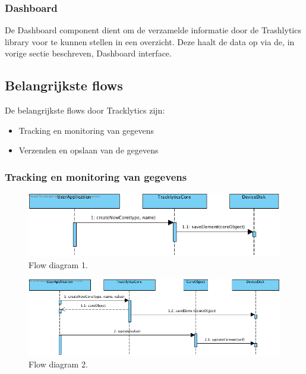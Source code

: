 \subsubsection{Dashboard}
De Dashboard component dient om de verzamelde informatie door de Trashlytics library voor te kunnen stellen in een overzicht. Deze haalt de data op via de, in vorige sectie beschreven, Dashboard interface. \\


\subsection{Belangrijkste flows}
De belangrijkste flows door Tracklytics zijn:
\begin{itemize}
\item Tracking en monitoring van gegevens
\item Verzenden en opslaan van de gegevens
\end{itemize} 


\subsubsection{Tracking en monitoring van gegevens}\label{sec:TrackingEnMonitoringVanGegevens}
\begin{figure}[!h]
  \centering
  \includegraphics[scale=0.4]{Afbeeldingen/Architectuur/FlowDiagram1}
  \caption{Flow diagram 1.}
  \label{fig:flow1}
\end{figure}
\begin{figure}[!h]
  \centering
  \includegraphics[scale=0.4]{Afbeeldingen/Architectuur/FlowDiagram2}
  \caption{Flow diagram 2.}
  \label{fig:flow2}
\end{figure}

